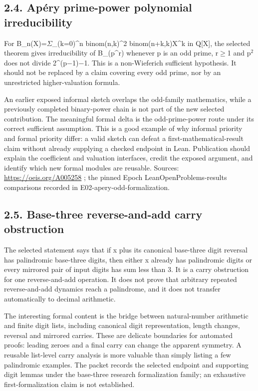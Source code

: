 \documentclass[11pt,a4paper]{article}
\begin{document}
\subsection{2.4. Apéry prime-power polynomial irreducibility}
For B\_n(X)=\ensuremath{\Sigma}\_(k=0)\textasciicircum{}n binom(n,k)\textasciicircum{}2 binom(n+k,k)X\textasciicircum{}k in Q[X], the selected theorem gives irreducibility of B\_(p\textasciicircum{}r) whenever p is an odd prime, r\ensuremath{\geq}1 and p\ensuremath{^2} does not divide 2\textasciicircum{}(p\ensuremath{-}1)\ensuremath{-}1. This is a non-Wieferich sufficient hypothesis. It should not be replaced by a claim covering every odd prime, nor by an unrestricted higher-valuation formula.

An earlier exposed informal sketch overlaps the odd-family mathematics, while a previously completed binary-power chain is not part of the new selected contribution. The meaningful formal delta is the odd-prime-power route under its correct sufficient assumption. This is a good example of why informal priority and formal priority differ: a valid sketch can defeat a first-mathematical-result claim without already supplying a checked endpoint in Lean. Publication should explain the coefficient and valuation interfaces, credit the exposed argument, and identify which new formal modules are reusable. Sources: \url{https://oeis.org/A005258} ; the pinned Epoch LeanOpenProblems-results comparisons recorded in E02-apery-odd-formalization.

\subsection{2.5. Base-three reverse-and-add carry obstruction}
The selected statement says that if x plus its canonical base-three digit reversal has palindromic base-three digits, then either x already has palindromic digits or every mirrored pair of input digits has sum less than 3. It is a carry obstruction for one reverse-and-add operation. It does not prove that arbitrary repeated reverse-and-add dynamics reach a palindrome, and it does not transfer automatically to decimal arithmetic.

The interesting formal content is the bridge between natural-number arithmetic and finite digit lists, including canonical digit representation, length changes, reversal and mirrored carries. These are delicate boundaries for automated proofs: leading zeroes and a final carry can change the apparent symmetry. A reusable list-level carry analysis is more valuable than simply listing a few palindromic examples. The packet records the selected endpoint and supporting digit lemmas under the base-three research formalization family; an exhaustive first-formalization claim is not established.
\end{document}

